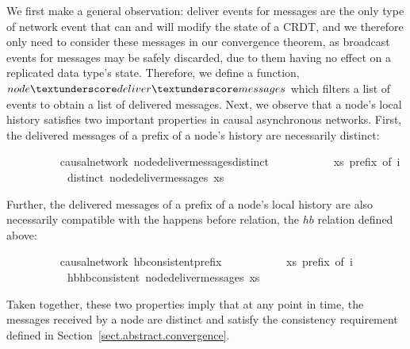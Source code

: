 \documentclass[acmlarge,review,anonymous]{acmart}\settopmatter{printfolios=true}
\begin{document}
We first make a general observation: deliver events for messages are the only type of network event that can and will modify the state of a CRDT, and we therefore only need to consider these messages in our convergence theorem, as broadcast events for messages may be safely discarded, due to them having no effect on a replicated data type's state.
Therefore, we define a function, $node{\isacharunderscore}deliver{\isacharunderscore}messages$ which filters a list of events to obtain a list of delivered messages.
Next, we observe that a node's local history satisfies two important properties in causal asynchronous networks.
First, the delivered messages of a prefix of a node's history are necessarily distinct:
\\
\begin{isabellebody}
\ \ \ \ \ \ \ \  {\isacharparenleft}\ causal{\isacharunderscore}network{\isacharparenright}\ node{\isacharunderscore}deliver{\isacharunderscore}messages{\isacharunderscore}distinct{\isacharcolon}\isanewline
\ \ \ \ \ \ \ \ \ \ \ {\isachardoublequoteopen}xs\ prefix\ of\ i{\isachardoublequoteclose}\isanewline
\ \ \ \ \ \ \ \ \ \ \ {\isachardoublequoteopen}distinct\ {\isacharparenleft}node{\isacharunderscore}deliver{\isacharunderscore}messages\ xs{\isacharparenright}{\isachardoublequoteclose}
\end{isabellebody}
\vspace{\baselineskip}
\noindent
Further, the delivered messages of a prefix of a node's local history are also necessarily compatible with the happens before relation, the $hb$ relation defined above:
\\
\begin{isabellebody}
\ \ \ \ \ \ \ \  {\isacharparenleft}\ causal{\isacharunderscore}network{\isacharparenright}\ hb{\isacharunderscore}consistent{\isacharunderscore}prefix{\isacharcolon}\isanewline
\ \ \ \ \ \ \ \ \ \ \ {\isachardoublequoteopen}xs\ prefix\ of\ i{\isachardoublequoteclose}\isanewline
\ \ \ \ \ \ \ \ \ \ \ {\isachardoublequoteopen}hb{\isachardot}hb{\isacharunderscore}consistent\ {\isacharparenleft}node{\isacharunderscore}deliver{\isacharunderscore}messages\ xs{\isacharparenright}{\isachardoublequoteclose}
\end{isabellebody}
\vspace{\baselineskip}
Taken together, these two properties imply that at any point in time, the messages received by a node are distinct and satisfy the consistency requirement defined in Section~\ref{sect.abstract.convergence}.
\end{document}
